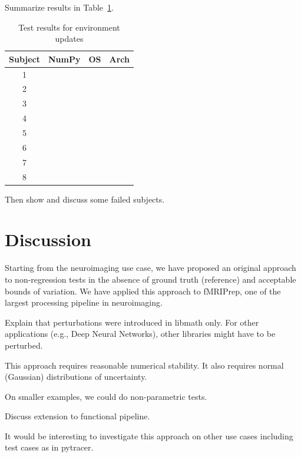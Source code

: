 \documentclass{article}
\begin{document}
Summarize results in Table~\ref{table:environment-updates}.
\begin{table}
\begin{center}
\begin{tabular}{cccc}
 Subject  & NumPy                & OS                 & Arch\\
  \hline
1 & \cellcolor{green!25} & \cellcolor{red!25} & \cellcolor{green!25}\\
2 & \cellcolor{green!25} & \cellcolor{red!25} & \cellcolor{green!25}\\
3 & \cellcolor{green!25} & \cellcolor{red!25} & \cellcolor{green!25}\\
4 & \cellcolor{green!25} & \cellcolor{red!25} & \cellcolor{green!25}\\
5 & \cellcolor{green!25} & \cellcolor{red!25} & \cellcolor{green!25}\\
6 & \cellcolor{green!25} & \cellcolor{red!25} & \cellcolor{green!25}\\
7 & \cellcolor{green!25} & \cellcolor{red!25} & \cellcolor{green!25}\\
8 & \cellcolor{green!25} & \cellcolor{red!25} & \cellcolor{green!25}\\
\end{tabular}
\caption{Test results for environment updates}
\label{table:environment-updates}
\end{center}
\end{table}
Then show and discuss some failed subjects.


\section{Discussion}
Starting from the neuroimaging use case, we have proposed an original approach to non-regression tests in the absence of ground truth (reference) and acceptable bounds of variation. We have applied this approach to fMRIPrep, one of the largest processing pipeline in neuroimaging. 

Explain that perturbations were introduced in libmath only. For other applications (e.g., Deep Neural Networks), other libraries might have to be perturbed.

This approach requires reasonable numerical stability. It also requires normal (Gaussian) distributions of uncertainty.

On smaller examples, we could do non-parametric tests.

Discuss extension to functional pipeline.

It would be interesting to investigate this approach on other use cases including test cases as in pytracer. 
\end{document}
